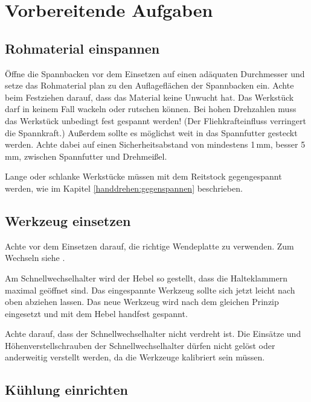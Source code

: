 \documentclass{\basedir/fablab-document}
\begin{document}
\clearpage


\newpage
\section{Vorbereitende Aufgaben}
\subsection{Rohmaterial einspannen}

Öffne die Spannbacken vor dem Einsetzen auf einen adäquaten Durchmesser und setze das Rohmaterial
plan zu den Auflageflächen der Spannbacken ein.
Achte beim Festziehen darauf, dass das Material keine Unwucht hat.
Das Werkstück darf in keinem Fall wackeln oder rutschen können.
Bei hohen Drehzahlen muss das Werkstück unbedingt fest gespannt werden!
(Der Fliehkrafteinfluss verringert die Spannkraft.)
Außerdem sollte es möglichst weit in das Spannfutter gesteckt werden.
Achte dabei auf einen Sicherheitsabstand von mindestens 1\,mm, besser 5\,mm, zwischen Spannfutter und Drehmeißel.

Lange oder schlanke Werkstücke müssen mit dem Reitstock gegengespannt werden,
wie im Kapitel \ref{handdrehen:gegenspannen} beschrieben.

\subsection{Werkzeug einsetzen} %
Achte vor dem Einsetzen darauf, die richtige Wendeplatte zu verwenden. Zum Wechseln siehe .

Am Schnellwechselhalter wird der Hebel so gestellt, dass die Halteklammern maximal geöffnet sind.
Das eingespannte Werkzeug sollte sich jetzt leicht nach oben abziehen lassen.
Das neue Werkzeug wird nach dem gleichen Prinzip eingesetzt und mit dem Hebel handfest gespannt.

Achte darauf, dass der Schnellwechselhalter nicht verdreht ist. Die Einsätze und Höhenverstellschrauben der Schnellwechselhalter dürfen nicht gelöst oder anderweitig verstellt werden, da die Werkzeuge kalibriert sein müssen.

\subsection{Kühlung einrichten}
\end{document}
